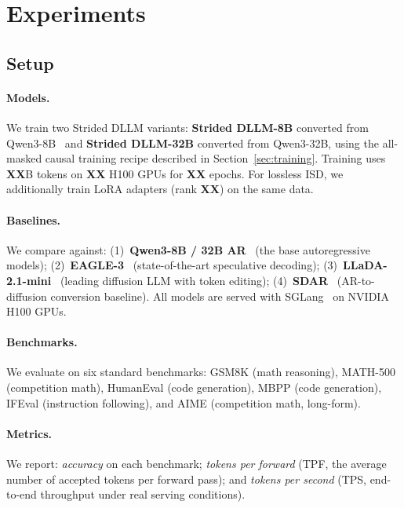 \section{Experiments}
\label{sec:experiments}

\subsection{Setup}
\label{sec:setup}

\paragraph{Models.}
We train two Strided DLLM variants: \textbf{Strided DLLM-8B} converted from Qwen3-8B~\citep{qwen3} and \textbf{Strided DLLM-32B} converted from Qwen3-32B, using the all-masked causal training recipe described in Section~\ref{sec:training}. Training uses \textbf{XX}B tokens on \textbf{XX} H100 GPUs for \textbf{XX} epochs. For lossless ISD, we additionally train LoRA adapters (rank \textbf{XX}) on the same data.

\paragraph{Baselines.}
We compare against: (1)~\textbf{Qwen3-8B / 32B AR}~\citep{qwen3} (the base autoregressive models); (2)~\textbf{EAGLE-3}~\citep{eagle3} (state-of-the-art speculative decoding); (3)~\textbf{LLaDA-2.1-mini}~\citep{llada21} (leading diffusion LLM with token editing); (4)~\textbf{SDAR}~\citep{sdar2025} (AR-to-diffusion conversion baseline). All models are served with SGLang~\citep{zheng2024sglang} on NVIDIA H100 GPUs.

\paragraph{Benchmarks.}
We evaluate on six standard benchmarks: GSM8K (math reasoning), MATH-500 (competition math), HumanEval (code generation), MBPP (code generation), IFEval (instruction following), and AIME (competition math, long-form).

\paragraph{Metrics.}
We report: \emph{accuracy} on each benchmark; \emph{tokens per forward} (TPF, the average number of accepted tokens per forward pass); and \emph{tokens per second} (TPS, end-to-end throughput under real serving conditions).

